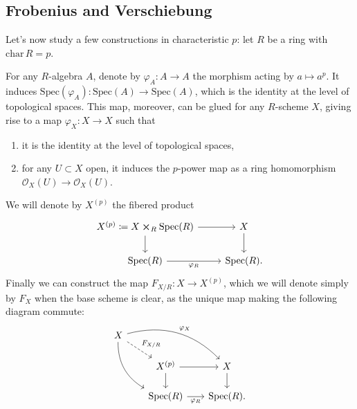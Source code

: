 \subsection{Frobenius and Verschiebung}\label{sec:FrobeniusVerschiebung}
Let's now study a few constructions in characteristic $p$:
let $R$ be a ring with $\mathrm{char}\, R = p$.


\begin{defn}[]
	For any $R$-algebra $A$,
	denote by $\varphi_A\colon A \to A$ the morphism
	acting by $a \mapsto a^p$.
	It induces $\mathrm{Spec}(\varphi_A)\colon \mathrm{Spec}(A) \to \mathrm{Spec}(A)$,
	which is the identity at the level of topological spaces.
	This map, moreover, can be glued for any $R$-scheme $X$, giving rise to a map
	$\varphi_X\colon X \to X$ such that
\begin{enumerate}
	\item it is the identity at the level of topological spaces,
	\item for any $U \subset X$ open, it induces the $p$-power map
		as a ring homomorphism $\mathcal{O}_{X}(U) \to \mathcal{O}_{ X }(U)$.
\end{enumerate}
	We will denote by $X^{(p)}$ the fibered product
	\begin{equation}
	\begin{tikzcd}
		X^{(p)} \coloneqq X \cross_{ R } \mathrm{Spec}(R) \arrow[r, "", rightarrow] 
		\arrow[d, "", rightarrow] &
		X \arrow[d, "", rightarrow] \\
		\mathrm{Spec}(R) \arrow[r, "\varphi_R"', rightarrow] &
		\mathrm{Spec}(R)
	.\end{tikzcd}
	\end{equation}
	Finally we can construct the map $F_{X/R} \colon X \to X^{(p)}$,
	which we will denote simply by $F_X$ when the base scheme is clear,
	as the unique map making the following diagram commute:
	\begin{equation}
	\begin{tikzcd}[row sep=1.6em, column sep=1.8em]
		X \arrow[rrd, "\varphi_X", rightarrow, bend left] 
		\arrow[rdd, "", rightarrow, bend right, end anchor=north west]
		\arrow[rd, "F_{X/R}", dashrightarrow] & & \\
		&
		X^{(p)} \arrow[r, "", rightarrow] 
		\arrow[d, "", rightarrow] &
		X \arrow[d, "", rightarrow] \\
		&
		\mathrm{Spec}(R) \arrow[r, "\varphi_R"', rightarrow] &
		\mathrm{Spec}(R)
	.\end{tikzcd}
	\end{equation}
\end{defn}


